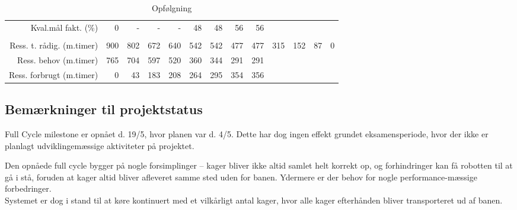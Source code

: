 \begin{sidewaystable}[!htbp]
\begin{scriptsize}
\begin{tabular}{r|rrrrrrrr|rrrr}
    Kval.mål fakt. (\%) & 0     & -   & -   & -   & 48  & 48    & 56    & 56    &       &       &  \\
          &       &       &       &       &       &       &       &       &       &       &  \\
    Ress. t. rådig. (m.timer) & 900   & 802   & 672   & 640   & 542   & 542   & 477   & 477   & 315   & 152   & 87    & 0 \\
    Ress. behov (m.timer) & 765   & 704 & 597 & 520   & 360   & 344   & 291   & 291   &       &       &   \\
    Ress. forbrugt (m.timer) & 0     & 43    & 183   & 208   & 264   & 295   & 354   & 356   &       &       &  \\
    \end{tabular}%
\end{scriptsize}
\caption{Opfølgning}\label{tab:opfolgning}
\end{sidewaystable}

\subsection{Bemærkninger til projektstatus}
Full Cycle milestone er opnået d. 19/5, hvor planen var d. 4/5. Dette har dog ingen effekt grundet eksamensperiode, hvor der ikke er planlagt udviklingemæssige aktiviteter på projektet.

Den opnåede full cycle bygger på nogle forsimplinger -- kager bliver ikke altid samlet helt korrekt op, og forhindringer kan få robotten til at gå i stå, foruden at kager altid bliver afleveret samme sted uden for banen. Ydermere er der behov for nogle performance-mæssige forbedringer.\\
Systemet er dog i stand til at køre kontinuert med et vilkårligt antal kager, hvor alle kager efterhånden bliver transporteret ud af banen.
